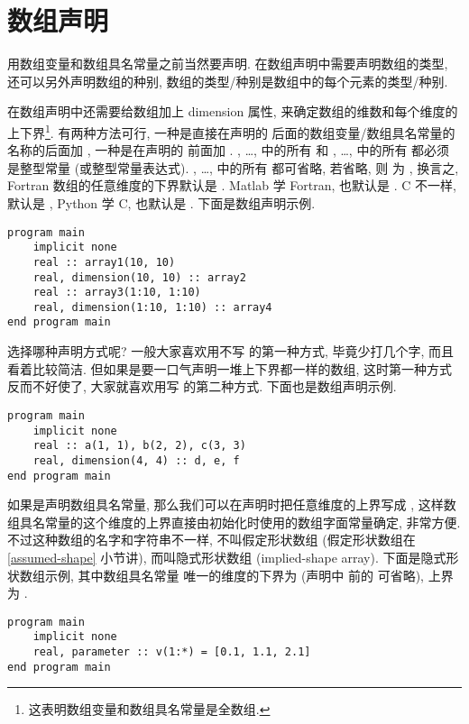 \section{数组声明}\label{fortran_array_specification}

用数组变量和数组具名常量之前当然要声明. 在数组声明中需要声明数组的类型, 还可以另外声明数组的种别, 数组的类型/种别是数组中的每个元素的类型/种别.

在数组声明中还需要给数组加上 dimension 属性, 来确定数组的维数和每个维度的上下界\footnote{这表明数组变量和数组具名常量是全数组.}. 有两种方法可行, 一种是直接在声明的 \ttt{::} 后面的数组变量/数组具名常量的名称的后面加 , 一种是在声明的 \ttt{::} 前面加 . , \dots,  中的所有  和 , \dots,  中的所有  都必须是整型常量 (或整型常量表达式). , \dots,  中的所有  都可省略, 若省略, 则  为 , 换言之, Fortran 数组的任意维度的下界默认是 . Matlab 学 Fortran, 也默认是 . C 不一样, 默认是 , Python 学 C, 也默认是 . 下面是数组声明示例.
\begin{lstlisting}
program main
    implicit none
    real :: array1(10, 10)
    real, dimension(10, 10) :: array2
    real :: array3(1:10, 1:10)
    real, dimension(1:10, 1:10) :: array4
end program main
\end{lstlisting}
选择哪种声明方式呢? 一般大家喜欢用不写  的第一种方式, 毕竟少打几个字, 而且看着比较简洁. 但如果是要一口气声明一堆上下界都一样的数组, 这时第一种方式反而不好使了, 大家就喜欢用写  的第二种方式. 下面也是数组声明示例.
\begin{lstlisting}
program main
    implicit none
    real :: a(1, 1), b(2, 2), c(3, 3)
    real, dimension(4, 4) :: d, e, f
end program main
\end{lstlisting}

如果是声明数组具名常量, 那么我们可以在声明时把任意维度的上界写成 \ttt{*}, 这样数组具名常量的这个维度的上界直接由初始化时使用的数组字面常量确定, 非常方便. 不过这种数组的名字和字符串不一样, 不叫假定形状数组 (假定形状数组在 \ref{assumed-shape} 小节讲), 而叫隐式形状数组 (implied-shape array). 下面是隐式形状数组示例, 其中数组具名常量  唯一的维度的下界为  (声明中 \ttt{*} 前的  可省略), 上界为 .
\begin{lstlisting}
program main
    implicit none
    real, parameter :: v(1:*) = [0.1, 1.1, 2.1]
end program main
\end{lstlisting}

